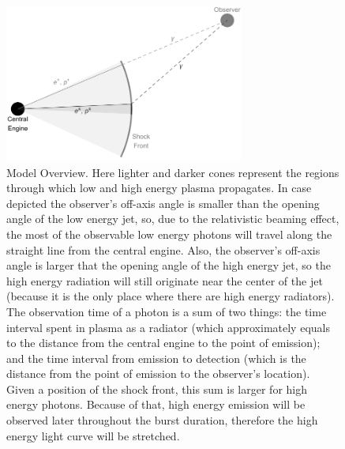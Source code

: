 \documentclass[11pt,a4paper]{article}
\begin{document}
\begin{figure}
	\centering
	\includegraphics[width=0.7\textwidth]{modelOverview}
	\caption{
        Model Overview.
        Here lighter and darker cones represent the regions through which low and high energy plasma propagates.
        In case depicted the observer's off-axis angle is smaller than the opening angle of the low energy jet, so, due to the relativistic beaming effect, the most of the observable low energy photons will travel along the straight line from the central engine.
        Also, the observer's off-axis angle is larger that the opening angle of the high energy jet, so the high energy radiation will still originate near the center of the jet (because it is the only place where there are high energy radiators).
        The observation time of a photon is a sum of two things: the time interval spent in plasma as a radiator (which approximately equals to the distance from the central engine to the point of emission); and the time interval from emission to detection (which is the distance from the point of emission to the observer's location).
        Given a position of the shock front, this sum is larger for high energy photons.
        Because of that, high energy emission will be observed later throughout the burst duration, therefore the high energy light curve will be stretched.
        }
    \label{fig:modelOverview}
\end{figure}
\end{document}
